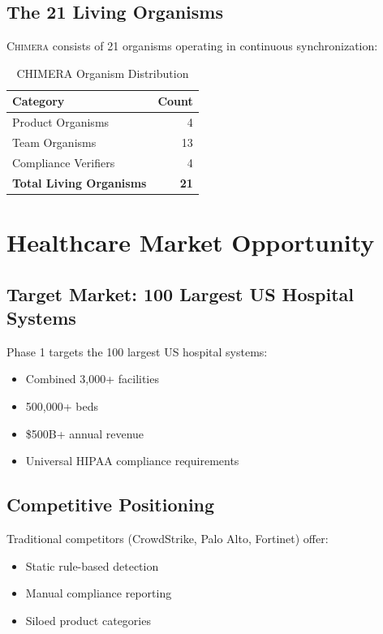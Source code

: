 \documentclass[12pt]{article}
\newcommand{\CHIMERA}{\textsc{Chimera}}
\begin{document}
\subsection{The 21 Living Organisms}

\CHIMERA{} consists of 21 organisms operating in continuous synchronization:

\begin{table}[htbp]
\centering
\caption{CHIMERA Organism Distribution}
\begin{tabular}{lr}
\toprule
\textbf{Category} & \textbf{Count} \\
\midrule
Product Organisms & 4 \\
Team Organisms & 13 \\
Compliance Verifiers & 4 \\
\midrule
\textbf{Total Living Organisms} & \textbf{21} \\
\bottomrule
\end{tabular}
\end{table}

\section{Healthcare Market Opportunity}
\label{sec:market}

\subsection{Target Market: 100 Largest US Hospital Systems}

Phase 1 targets the 100 largest US hospital systems:
\begin{itemize}[nosep]
  \item Combined 3,000+ facilities
  \item 500,000+ beds
  \item \$500B+ annual revenue
  \item Universal HIPAA compliance requirements
\end{itemize}

\subsection{Competitive Positioning}

Traditional competitors (CrowdStrike, Palo Alto, Fortinet) offer:
\begin{itemize}[nosep]
  \item Static rule-based detection
  \item Manual compliance reporting
  \item Siloed product categories
\end{itemize}
\end{document}
